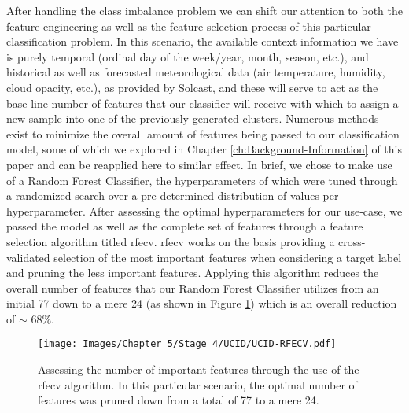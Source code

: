 \noindent \newline After handling the class imbalance problem we can shift our attention to both the feature engineering as well as the feature selection process of this particular classification problem. In this scenario, the available context information we have is purely temporal (ordinal day of the week/year, month, season, etc.), and historical as well as forecasted meteorological data (air temperature, humidity, cloud opacity, etc.), as provided by Solcast, and these will serve to act as the base-line number of features that our classifier will receive with which to assign a new sample into one of the previously generated clusters. Numerous methods exist to minimize the overall amount of features being passed to our classification model, some of which we explored in Chapter \ref{ch:Background-Information} of this paper and can be reapplied here to similar effect. In brief, we chose to make use of a Random Forest Classifier, the hyperparameters of which were tuned through a randomized search over a pre-determined distribution of values per hyperparameter. After assessing the optimal hyperparameters for our use-case, we passed the model as well as the complete set of features through a feature selection algorithm titled \gls{rfecv}. \gls{rfecv} works on the basis providing a cross-validated selection of the most important features when considering a target label and pruning the less important features. Applying this algorithm reduces the overall number of features that our Random Forest Classifier utilizes from an initial 77 down to a mere 24 (as shown in Figure \ref{fig:UCID-RFECV}) which is an overall reduction of $\sim$ 68\%.

\begin{figure}[H]
    \centering
    \texttt{[image: Images/Chapter 5/Stage 4/UCID/UCID-RFECV.pdf]}
    \caption{Assessing the number of important features through the use of the \gls{rfecv} algorithm. In this particular scenario, the optimal number of features was pruned down from a total of 77 to a mere 24.}
    \label{fig:UCID-RFECV}
\end{figure}

